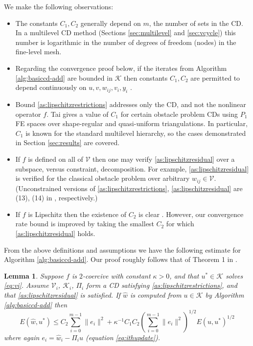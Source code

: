 \documentclass[letterpaper,final,12pt,reqno]{amsart}
\theoremstyle{cstyle}
\newtheorem{lemma}[theorem]{Lemma}
\theoremstyle{cstyle*}
\theoremstyle{dstyle}
\numberwithin{equation}{section}
\numberwithin{figure}{section}
\numberwithin{table}{section}
\numberwithin{theorem}{section}
\newcommand{\cV}{\mathcal{V}}
\begin{document}
We make the following observations:
\begin{itemize}
\item The constants $C_1,C_2$ generally depend on $m$, the number of sets in the CD.  In a multilevel CD method (Sections \ref{sec:multilevel} and \ref{sec:vcycle}) this number is logarithmic in the number of degrees of freedom (nodes) in the fine-level mesh.
\item Regarding the convergence proof below, if the iterates from Algorithm \ref{alg:basiccd-add} are bounded in $\mathcal{K}$ then constants $C_1,C_2$ are permitted to depend continuously on $u,v,w_{ij},v_i,y_i$ \cite{Tai2003}.
\item Bound \eqref{as:lipschitzrestrictions} addresses only the CD, and not the nonlinear operator $f$.  Tai \cite{Tai2003} gives a value of $C_1$ for certain obstacle problem CDs using $P_1$ FE spaces over shape-regular and quasi-uniform triangulations.  In particular, $C_1$ is known for the standard multilevel hierarchy, so the cases demonstrated in Section \ref{sec:results} are covered.
\item If $f$ is defined on all of $\mathcal{V}$ then one may verify \eqref{as:lipschitzresidual} over a subspace, versus constraint, decomposition.  For example, \eqref{as:lipschitzresidual} is verified for the classical obstacle problem over arbitrary $w_{ij} \in \cV$.  (Unconstrained versions of \eqref{as:lipschitzrestrictions}, \eqref{as:lipschitzresidual} are (13), (14) in \cite{TaiXu2002}, respectively.)
\item If $f$ is Lipschitz then the existence of $C_2$ is clear \cite{TaiXu2002}.  However, our convergence rate bound is improved by taking the smallest $C_2$ for which \eqref{as:lipschitzresidual} holds.
\end{itemize}

From the above definitions and assumptions we have the following estimate for Algorithm \ref{alg:basiccd-add}.  Our proof roughly follows that of Theorem 1 in \cite{Tai2003}.

\begin{lemma} \label{lem:core}  Suppose $f$ is $2$-coercive with constant $\kappa>0$, and that $u^* \in \mathcal{K}$ solves \eqref{eq:vi}.  Assume $\mathcal{V}_i$, $\mathcal{K}_i$, $\Pi_i$ form a CD satisfying \eqref{as:lipschitzrestrictions}, and that \eqref{as:lipschitzresidual} is satisfied.  If $\hat w$ is computed from $u \in \mathcal{K}$ by Algorithm \ref{alg:basiccd-add} then
\begin{equation}
   E(\hat w,u^*) \le C_2 \sum_{i=0}^{m-1} \|e_i\|^2 + \kappa^{-1} C_1 C_2 \left(\sum_{i=0}^{m-1} \|e_i\|^2\right)^{1/2} E(u,u^*)^{1/2} \label{eq:core}
\end{equation}
where again $e_i=\hat w_i - \Pi_i u$ (equation \eqref{eq:ithupdate}).
\end{lemma}
\end{document}
